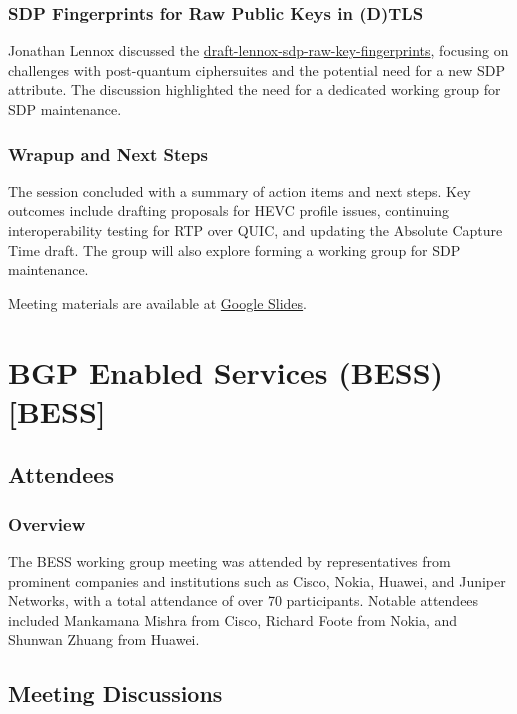 \documentclass{article}
\begin{document}
\subsubsection{SDP Fingerprints for Raw Public Keys in (D)TLS}
Jonathan Lennox discussed the \href{https://datatracker.ietf.org/doc/html/draft-lennox-sdp-raw-key-fingerprints}{draft-lennox-sdp-raw-key-fingerprints}, focusing on challenges with post-quantum ciphersuites and the potential need for a new SDP attribute. The discussion highlighted the need for a dedicated working group for SDP maintenance.

\subsubsection{Wrapup and Next Steps}
The session concluded with a summary of action items and next steps. Key outcomes include drafting proposals for HEVC profile issues, continuing interoperability testing for RTP over QUIC, and updating the Absolute Capture Time draft. The group will also explore forming a working group for SDP maintenance.

Meeting materials are available at \href{https://docs.google.com/presentation/d/1bLGLkbxmi4w8Od5vUU-YTRREF8sEBJP0XBJOTdm4-T8/}{Google Slides}.




\newpage

\section{BGP Enabled Services (BESS) [BESS]}

\subsection{Attendees}
\subsubsection{Overview}
The BESS working group meeting was attended by representatives from prominent companies and institutions such as Cisco, Nokia, Huawei, and Juniper Networks, with a total attendance of over 70 participants. Notable attendees included Mankamana Mishra from Cisco, Richard Foote from Nokia, and Shunwan Zhuang from Huawei.

\subsection{Meeting Discussions}
\end{document}
